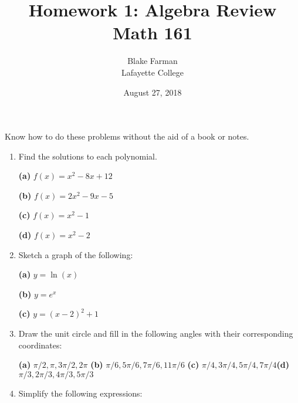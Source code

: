 \documentclass{amsart}
\title[Homework 1]{Homework 1: Algebra Review\\Math 161}
\date{August 27, 2018}
\author{Blake Farman\\Lafayette College}
\begin{document}
\maketitle

\makenameslot

\begin{center}
  {\large Know how to do these problems without the aid of a book or notes.}
\end{center}
\begin{enumerate}[1.]
  
\item Find the solutions to each polynomial.

{\bf (a)} $f(x)=x^2-8x+12$

\vspace{1in}

{\bf (b)} $f(x)=2x^2-9x-5$

\vspace{1in}

{\bf (c)} $f(x)=x^2-1$

\vspace{1in}

{\bf (d)} $f(x)=x^2-2$

\vspace{1in}

\item Sketch a graph of the following:

{\bf (a)} $y=\ln(x)$

\vspace{1in}

{\bf (b)} $y=e^x$

\vspace{1in}

{\bf (c)} $y=(x-2)^2+1$

\vspace{1in}

\item Draw the unit circle and fill in the following angles with their corresponding coordinates:

{\bf (a)} $\pi/2,\pi,3\pi/2,2\pi$ {\hspace{.2in}}{\bf (b)} $\pi/6,5\pi/6,7\pi/6,11\pi/6$ {\hspace{.2in}} {\bf (c)} $\pi/4,3\pi/4,5\pi/4,7\pi/4${\hspace{.2in}}{\bf (d)}$\pi/3,2\pi/3,4\pi/3,5\pi/3$

\newpage

\item Simplify the following expressions:


\end{enumerate}
\end{document}
